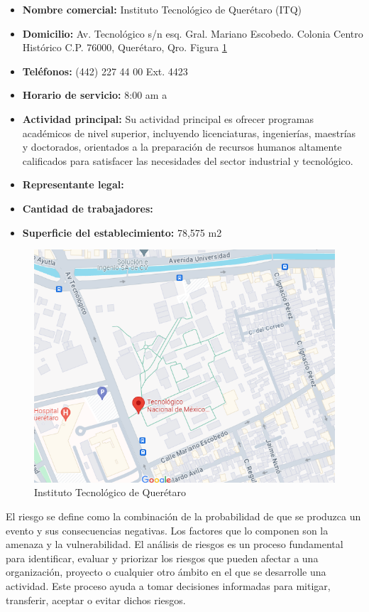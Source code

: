 \begin{itemize}
    \item\textbf{Nombre comercial:} Instituto Tecnológico de Querétaro (ITQ)
    \item\textbf{Domicilio:} Av. Tecnológico s/n esq. Gral. Mariano Escobedo. Colonia Centro Histórico C.P. 76000, Querétaro, Qro. Figura \ref{fig:plano.png}
    \item\textbf{Teléfonos:} (442) 227 44 00 Ext. 4423
    \item\textbf{Horario de servicio:} 8:00 am a 
    \item\textbf{Actividad principal:} Su actividad principal es ofrecer programas académicos de nivel superior, incluyendo licenciaturas, ingenierías, maestrías y doctorados, orientados a la preparación de recursos humanos altamente calificados para satisfacer las necesidades del sector industrial y tecnológico.
    \item\textbf{Representante legal:} 
    \item\textbf{Cantidad de trabajadores:} 
    \item\textbf{Superficie del establecimiento:} 78,575 m2
\end{itemize}
%
%
\begin{figure}[H]
    \centering
    \includegraphics[scale=0.4]{10/Img/plano.png}
    \caption{Instituto Tecnológico de Querétaro}
    \label{fig:plano.png}
\end{figure}
%
%

El riesgo se define como la combinación de la probabilidad de que se produzca un evento y sus consecuencias negativas. Los factores que lo componen son la amenaza y la vulnerabilidad.\cite{Riesgo}
\newline
El análisis de riesgos es un proceso fundamental para identificar, evaluar y priorizar los riesgos que pueden afectar a una organización, proyecto o cualquier otro ámbito en el que se desarrolle una actividad. Este proceso ayuda a tomar decisiones informadas para mitigar, transferir, aceptar o evitar dichos riesgos.

